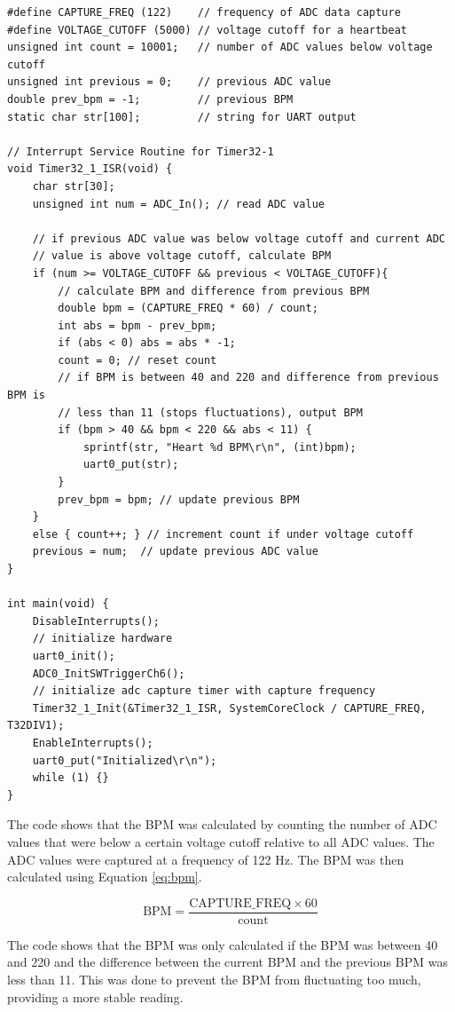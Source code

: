\documentclass[CMPE]{KGCOEReport}
\begin{document}
\begin{verbatim}
#define CAPTURE_FREQ (122)    // frequency of ADC data capture
#define VOLTAGE_CUTOFF (5000) // voltage cutoff for a heartbeat
unsigned int count = 10001;   // number of ADC values below voltage cutoff
unsigned int previous = 0;    // previous ADC value
double prev_bpm = -1;         // previous BPM
static char str[100];         // string for UART output

// Interrupt Service Routine for Timer32-1
void Timer32_1_ISR(void) {
    char str[30];
    unsigned int num = ADC_In(); // read ADC value

    // if previous ADC value was below voltage cutoff and current ADC
    // value is above voltage cutoff, calculate BPM
    if (num >= VOLTAGE_CUTOFF && previous < VOLTAGE_CUTOFF){
        // calculate BPM and difference from previous BPM
        double bpm = (CAPTURE_FREQ * 60) / count;
        int abs = bpm - prev_bpm;
        if (abs < 0) abs = abs * -1;
        count = 0; // reset count
        // if BPM is between 40 and 220 and difference from previous BPM is
        // less than 11 (stops fluctuations), output BPM
        if (bpm > 40 && bpm < 220 && abs < 11) {
            sprintf(str, "Heart %d BPM\r\n", (int)bpm);
            uart0_put(str);
        }
        prev_bpm = bpm; // update previous BPM
    }
    else { count++; } // increment count if under voltage cutoff
    previous = num;  // update previous ADC value
}

int main(void) {
    DisableInterrupts();
    // initialize hardware
    uart0_init();
    ADC0_InitSWTriggerCh6();
    // initialize adc capture timer with capture frequency
    Timer32_1_Init(&Timer32_1_ISR, SystemCoreClock / CAPTURE_FREQ, T32DIV1);
    EnableInterrupts();
    uart0_put("Initialized\r\n");
    while (1) {}
}
\end{verbatim}

The code shows that the BPM was calculated by counting the number of ADC values that were below a certain voltage cutoff relative to all ADC values. The ADC values were captured at a frequency of 122 Hz. The BPM was then calculated using Equation \ref{eq:bpm}.

\begin{equation}
\text{BPM} = \frac{\text{CAPTURE\_FREQ} \times 60}{\text{count}} \label{eq:bpm}
\end{equation}

The code shows that the BPM was only calculated if the BPM was between 40 and 220 and the difference between the current BPM and the previous BPM was less than 11. This was done to prevent the BPM from fluctuating too much, providing a more stable reading.\\
\end{document}
